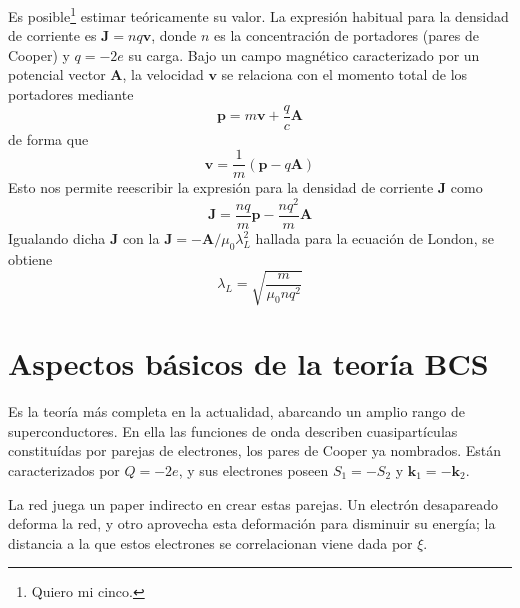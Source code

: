\documentclass{tufte-book}
\newcommand{\sub}[1]{_{{\scriptscriptstyle\mathit{#1}}}}
\begin{document}
Es posible\footnote{Quiero mi cinco.} estimar teóricamente su valor.
La expresión habitual para la densidad de corriente es $\symbf{J}=nq
\symbf{v}$, donde $n$ es la concentración de portadores (pares de
Cooper) y $q=-2e$ su carga. Bajo un campo magnético caracterizado por
un potencial vector $\symbf{A}$, la velocidad $\symbf{v}$ se relaciona
con el momento total de los portadores mediante
\begin{equation}
  \symbf{p} = m \symbf{v} + \frac{q}{c} \symbf{A}
\end{equation}
de forma que
\begin{equation}
  \symbf{v} = \frac{1}{m} \left( \symbf{p}-q \symbf{A} \right)
\end{equation}
Esto nos permite reescribir la expresión para la densidad de corriente
$\symbf{J}$ como
\begin{equation}
  \symbf{J} = \frac{nq}{m} \symbf{p} - \frac{nq^2}{m} \symbf{A}
\end{equation}
Igualando dicha $\symbf{J}$ con la $\symbf{J} =
-\symbf{A}/μ_0λ\sub{L}^2$ hallada para la ecuación de London, se
obtiene
\begin{equation}
  λ\sub{L} = \sqrt{\frac{m}{μ_0nq^2}}
\end{equation}

\section{Aspectos básicos de la teoría BCS}
Es la teoría más completa en la actualidad, abarcando un amplio rango
de superconductores. En ella las funciones de onda describen
cuasipartículas constituídas por parejas de electrones, los pares de
Cooper ya nombrados. Están caracterizados por $Q=-2e$, y sus
electrones poseen $S_1=-S_2$ y $\symbf{k}_1=-\symbf{k}_2$.

La red juega un paper %
indirecto en crear estas parejas. Un electrón desapareado deforma la
red, y otro aprovecha esta deformación para disminuir su energía; la
distancia a la que estos electrones se correlacionan viene dada por $ξ$.
\end{document}

